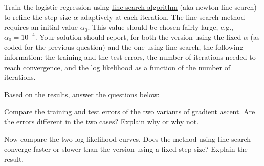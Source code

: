 \documentclass[12pt]{article}
\newenvironment{problem}[2][Problem:]{\begin{trivlist}
\item[\hskip \labelsep {\bfseries #1}\hskip \labelsep {\bfseries #2.}]}{\end{trivlist}}
\begin{document}
\begin{problem}{Programming: Line search optimization [8 points]}
Train the logistic regression using \href{https://en.wikipedia.org/wiki/Line_search}{line search algorithm} (aka newton line-search) to refine the step size $\alpha$ adaptively at each iteration. The line search method requires an initial value $\alpha_0$. This value should be chosen fairly large, e.g., $\alpha_0 = 10^{-4}$. Your solution should report, for both the version using the fixed $\alpha$ (as coded for the previous question) and the one using line search, the following information: the training and the test errors, the number of iterations needed to reach convergence, and the log likelihood as a function of the number of iterations. 
\end{problem}

Based on the results, answer the questions below:

\begin{problem}{Writing [2 points]}
Compare the training and test errors of the two variants of gradient ascent. Are the errors different in the two cases? Explain why or why not.
\end{problem}

\begin{problem}{Writing [2 points]}
Now compare the two log likelihood curves. Does the method using line search converge faster or slower than the version using a fixed step size? Explain the result.
\end{problem}
\end{document}
